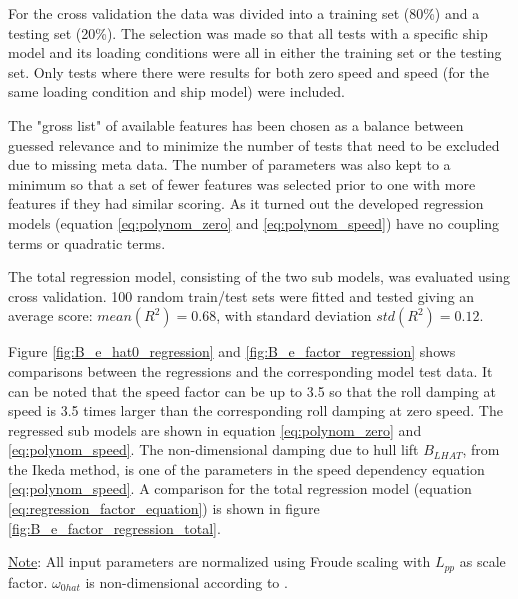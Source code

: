 For the cross validation the data was divided into a  training set (80\%) and a testing set (20\%). The selection was made so that all tests with a specific ship model and its loading conditions were all in either the training set or the testing set. Only tests where there were results for both zero speed and speed (for the same loading condition and ship model) were included.

The "gross list" of available features has been chosen as a balance between guessed relevance and to minimize the number of tests that need to be excluded due to missing meta data. 
The number of parameters was also kept to a minimum so that a set of fewer features was selected prior to one with more features if they had similar scoring. As it turned out the developed regression models (equation \ref{eq:polynom_zero} and \ref{eq:polynom_speed}) have no coupling terms or quadratic terms.

The total regression model, consisting of the two sub models, was evaluated using cross validation. 100 random train/test sets were fitted and tested giving an average score: $mean(R^2)=0.68$, with standard deviation $std(R^2)=0.12$.

Figure \ref{fig:B_e_hat0_regression} and \ref{fig:B_e_factor_regression} shows comparisons between the regressions and the corresponding model test data. It can be noted that the speed factor can be up to 3.5 so that the roll damping at speed is 3.5 times larger than the corresponding roll damping at zero speed. The regressed sub models are shown in equation \ref{eq:polynom_zero} and \ref{eq:polynom_speed}. The non-dimensional damping due to hull lift $B_{LHAT}$, from the Ikeda method, is one of the parameters in the speed dependency equation \ref{eq:polynom_speed}. A comparison for the total regression model (equation \ref{eq:regression_factor_equation}) is shown in figure \ref{fig:B_e_factor_regression_total}.



{\footnotesize \underline{Note}: All input parameters are normalized using Froude scaling with $L_{pp}$ as scale factor. $\omega_{0hat}$ is non-dimensional according to \parencite{himeno_prediction_1981}.} 

